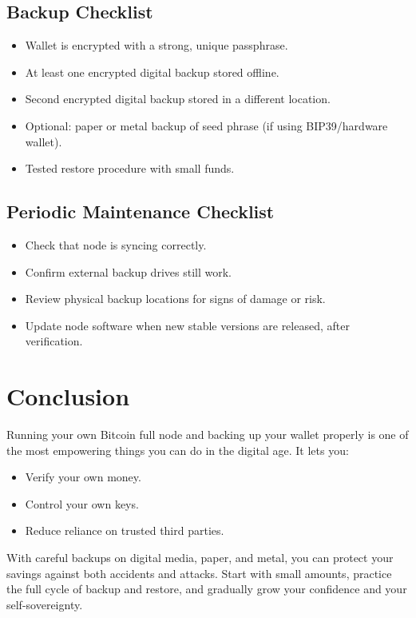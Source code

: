 \documentclass[12pt,a4paper]{book}
\begin{document}
\section{Backup Checklist}

\begin{itemize}
  \item[\(\square\)] Wallet is encrypted with a strong, unique passphrase.
  \item[\(\square\)] At least one encrypted digital backup stored offline.
  \item[\(\square\)] Second encrypted digital backup stored in a different location.
  \item[\(\square\)] Optional: paper or metal backup of seed phrase (if using BIP39/hardware wallet).
  \item[\(\square\)] Tested restore procedure with small funds.
\end{itemize}

\section{Periodic Maintenance Checklist}

\begin{itemize}
  \item[\(\square\)] Check that node is syncing correctly.
  \item[\(\square\)] Confirm external backup drives still work.
  \item[\(\square\)] Review physical backup locations for signs of damage or risk.
  \item[\(\square\)] Update node software when new stable versions are released, after verification.
\end{itemize}

\chapter*{Conclusion}

Running your own Bitcoin full node and backing up your wallet properly is one of the most empowering things you can do in the digital age. It lets you:

\begin{itemize}
  \item Verify your own money.
  \item Control your own keys.
  \item Reduce reliance on trusted third parties.
\end{itemize}

With careful backups on digital media, paper, and metal, you can protect your savings against both accidents and attacks. Start with small amounts, practice the full cycle of backup and restore, and gradually grow your confidence and your self-sovereignty.
\end{document}
